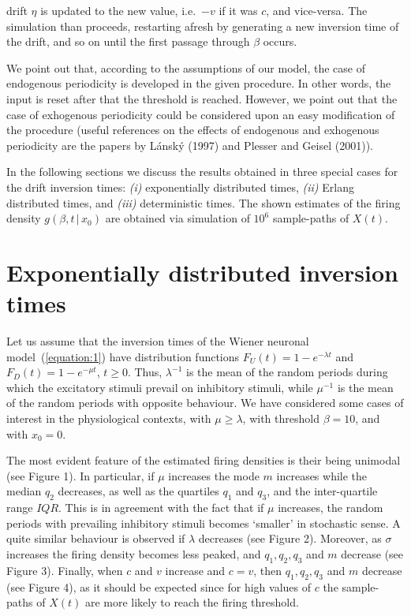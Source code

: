 drift $\eta$ is updated to the new value, i.e.\ $-v$ if it was $c$, and vice-versa. 
The simulation than proceeds, restarting afresh by generating a new inversion time 
of the drift, and so on until the first passage through $\beta$ occurs.
\par
We point out that, according to the assumptions of our model, the case of endogenous 
periodicity is developed in the given procedure. In other words, the input is reset 
after that the threshold is reached. However, we point out that the case of 
exhogenous periodicity could be considered upon an easy modification of the 
procedure (useful references on the effects of endogenous and exhogenous 
periodicity are the papers by L\'ansk\'y (1997) and Plesser and Geisel (2001)). 
\par
In the following sections we discuss the results obtained in three special cases 
for the drift inversion times: {\em (i)\/} exponentially distributed times, 
{\em (ii)\/} Erlang distributed times, and {\em (iii)\/} deterministic times. 
The shown estimates of the firing density $g(\beta,t\,|\,x_0)$ are obtained
via simulation of $10^6$ sample-paths of $X(t)$. 
\section{Exponentially distributed inversion times}\label{section:5}
Let us assume that the inversion times of the Wiener neuronal 
model~(\ref{equation:1}) have distribution functions
$F_U(t)=1-e^{-\lambda t}$ and $F_D(t)=1-e^{-\mu t}$, $t\geq 0$.
Thus, $\lambda^{-1}$ is the mean of the random periods during which
the excitatory stimuli prevail on inhibitory stimuli, while $\mu^{-1}$
is the mean of the random periods with opposite behaviour.
We have considered some cases of interest in the physiological contexts, 
with $\mu\geq\lambda$, with threshold $\beta=10$, and with $x_0=0$.
\par
The most evident feature of the estimated firing densities is their being 
unimodal (see Figure 1). In particular, if $\mu$ increases the mode $m$ 
increases while the median $q_2$ decreases, as well as the quartiles $q_1$ 
and $q_3$, and the inter-quartile range $IQR$. This is in agreement with 
the fact that if $\mu$ increases, the random periods with prevailing 
inhibitory stimuli becomes `smaller' in stochastic sense. A quite similar 
behaviour is observed if $\lambda$ decreases (see Figure 2). Moreover, as 
$\sigma$ increases the firing density becomes less peaked, and $q_1,q_2,q_3$ 
and $m$ decrease (see Figure 3). Finally, when $c$ and $v$ increase and $c=v$, 
then $q_1,q_2,q_3$ and $m$ decrease (see Figure 4), as it should be expected 
since for high values of $c$ the sample-paths of $X(t)$ are more likely 
to reach the firing threshold.

